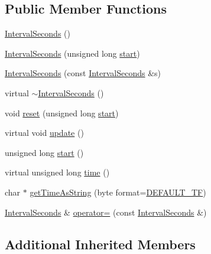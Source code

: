 \subsection*{Public Member Functions}
\begin{DoxyCompactItemize}
\item 
\hyperlink{classsmrtobj_1_1timer_1_1_interval_seconds_ac20f0f88661147329c47f397ca327900}{Interval\+Seconds} ()
\item 
\hyperlink{classsmrtobj_1_1timer_1_1_interval_seconds_ab6e29ed19bd3b68089c249fe16b62f42}{Interval\+Seconds} (unsigned long \hyperlink{classsmrtobj_1_1timer_1_1_interval_seconds_a1f8919a76123d44358ff32a1066c42b6}{start})
\item 
\hyperlink{classsmrtobj_1_1timer_1_1_interval_seconds_a3867300221f4967d7330c6ccced4813f}{Interval\+Seconds} (const \hyperlink{classsmrtobj_1_1timer_1_1_interval_seconds}{Interval\+Seconds} \&s)
\item 
virtual \hyperlink{classsmrtobj_1_1timer_1_1_interval_seconds_ac91271734ede29acfb795e4a0980f039}{$\sim$\+Interval\+Seconds} ()
\item 
void \hyperlink{classsmrtobj_1_1timer_1_1_interval_seconds_a0a2d997d360532f179a43c6d858afd37}{reset} (unsigned long \hyperlink{classsmrtobj_1_1timer_1_1_interval_seconds_a1f8919a76123d44358ff32a1066c42b6}{start})
\item 
virtual void \hyperlink{classsmrtobj_1_1timer_1_1_interval_seconds_a7253c7ab7b9e311dd13bbefbaa807c78}{update} ()
\item 
unsigned long \hyperlink{classsmrtobj_1_1timer_1_1_interval_seconds_a1f8919a76123d44358ff32a1066c42b6}{start} ()
\item 
virtual unsigned long \hyperlink{classsmrtobj_1_1timer_1_1_interval_seconds_a677364e751bbed28d85980f1270575a8}{time} ()
\item 
char $\ast$ \hyperlink{classsmrtobj_1_1timer_1_1_interval_seconds_ac4d08e03f84041a3132616b291c4c0ea}{get\+Time\+As\+String} (byte format=\hyperlink{classsmrtobj_1_1timer_1_1_interval_seconds_a6ea1edd04e074d9fbaacee7ce297c7f8a5e6def1fd27d935d55908db5ce04e808}{D\+E\+F\+A\+U\+L\+T\+\_\+\+T\+F})
\item 
\hyperlink{classsmrtobj_1_1timer_1_1_interval_seconds}{Interval\+Seconds} \& \hyperlink{classsmrtobj_1_1timer_1_1_interval_seconds_a2cc3e997f084e994bcf38494be513f02}{operator=} (const \hyperlink{classsmrtobj_1_1timer_1_1_interval_seconds}{Interval\+Seconds} \&)
\end{DoxyCompactItemize}
\subsection*{Additional Inherited Members}


